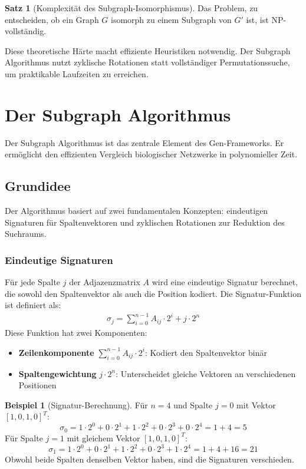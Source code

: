 ﻿\documentclass[a4paper,12pt]{article}
\theoremstyle{definition}
\newtheorem{beispiel}{Beispiel}
\newtheorem{satz}{Satz}
\begin{document}
\begin{satz}[Komplexität des Subgraph-Isomorphismus]
	Das Problem, zu entscheiden, ob ein Graph $G$ isomorph zu einem Subgraph von $G'$ ist, ist NP-vollständig.
\end{satz}

Diese theoretische Härte macht effiziente Heuristiken notwendig. Der Subgraph Algorithmus nutzt zyklische Rotationen statt vollständiger Permutationssuche, um praktikable Laufzeiten zu erreichen.

\section{Der Subgraph Algorithmus}

Der Subgraph Algorithmus ist das zentrale Element des Gen-Frameworks. Er ermöglicht den effizienten Vergleich biologischer Netzwerke in polynomieller Zeit.

\subsection{Grundidee}

Der Algorithmus basiert auf zwei fundamentalen Konzepten: eindeutigen Signaturen für Spaltenvektoren und zyklischen Rotationen zur Reduktion des Suchraums.

\subsubsection{Eindeutige Signaturen}

Für jede Spalte $j$ der Adjazenzmatrix $A$ wird eine eindeutige Signatur berechnet, die sowohl den Spaltenvektor als auch die Position kodiert. Die Signatur-Funktion ist definiert als:
\begin{align}
	\sigma_j = \sum_{i=0}^{n-1} A_{ij} \cdot 2^i + j \cdot 2^n
\end{align}
Diese Funktion hat zwei Komponenten:
\begin{itemize}
	\item[-] \textbf{Zeilenkomponente} $\sum_{i=0}^{n-1} A_{ij} \cdot 2^i$: Kodiert den Spaltenvektor binär
	\item[-] \textbf{Spaltengewichtung} $j \cdot 2^n$: Unterscheidet gleiche Vektoren an verschiedenen Positionen
\end{itemize}

\begin{beispiel}[Signatur-Berechnung]
	Für $n=4$ und Spalte $j=0$ mit Vektor $[1, 0, 1, 0]^T$:
	\[
	\sigma_0 = 1 \cdot 2^0 + 0 \cdot 2^1 + 1 \cdot 2^2 + 0 \cdot 2^3 + 0 \cdot 2^4 = 1 + 4 = 5
	\]
	Für Spalte $j=1$ mit gleichem Vektor $[1, 0, 1, 0]^T$:
	\[
	\sigma_1 = 1 \cdot 2^0 + 0 \cdot 2^1 + 1 \cdot 2^2 + 0 \cdot 2^3 + 1 \cdot 2^4 = 1 + 4 + 16 = 21
	\]
	Obwohl beide Spalten denselben Vektor haben, sind die Signaturen verschieden.
\end{beispiel}
\end{document}
